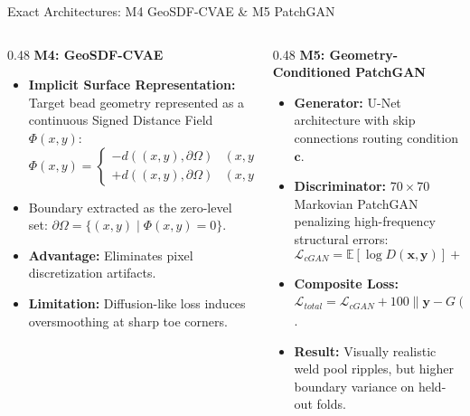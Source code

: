 \documentclass[aspectratio=169]{beamer}
\begin{document}
\begin{frame}{Exact Architectures: M4 GeoSDF-CVAE \& M5 PatchGAN}
	\begin{columns}[T]
		\begin{column}{0.48\textwidth}
			\textbf{M4: GeoSDF-CVAE}
			\begin{itemize}
				\scriptsize
				\item \textbf{Implicit Surface Representation:}
				Target bead geometry represented as a continuous Signed Distance Field $\Phi(x, y)$:
				$$\Phi(x, y) = \begin{cases} -d((x, y), \partial \Omega) & (x, y) \in \Omega \\ +d((x, y), \partial \Omega) & (x, y) \notin \Omega \end{cases}$$
				\item Boundary extracted as the zero-level set: $\partial \Omega = \{(x, y) \mid \Phi(x, y) = 0\}$.
				\item \textbf{Advantage:} Eliminates pixel discretization artifacts.
				\item \textbf{Limitation:} Diffusion-like loss induces oversmoothing at sharp toe corners.
			\end{itemize}
		\end{column}
		\begin{column}{0.48\textwidth}
			\textbf{M5: Geometry-Conditioned PatchGAN}
			\begin{itemize}
				\scriptsize
				\item \textbf{Generator:} U-Net architecture with skip connections routing condition $\mathbf{c}$.
				\item \textbf{Discriminator:} $70 \times 70$ Markovian PatchGAN penalizing high-frequency structural errors:
				$$\mathcal{L}_{cGAN} = \mathbb{E}[\log D(\mathbf{x}, \mathbf{y})] + \mathbb{E}[\log(1 - D(\mathbf{x}, G(\mathbf{x}, \mathbf{z})))]$$
				\item \textbf{Composite Loss:} $\mathcal{L}_{total} = \mathcal{L}_{cGAN} + 100 \|\mathbf{y} - G(\mathbf{x})\|_1$.
				\item \textbf{Result:} Visually realistic weld pool ripples, but higher boundary variance on held-out folds.
			\end{itemize}
		\end{column}
	\end{columns}
\end{frame}
\end{document}
